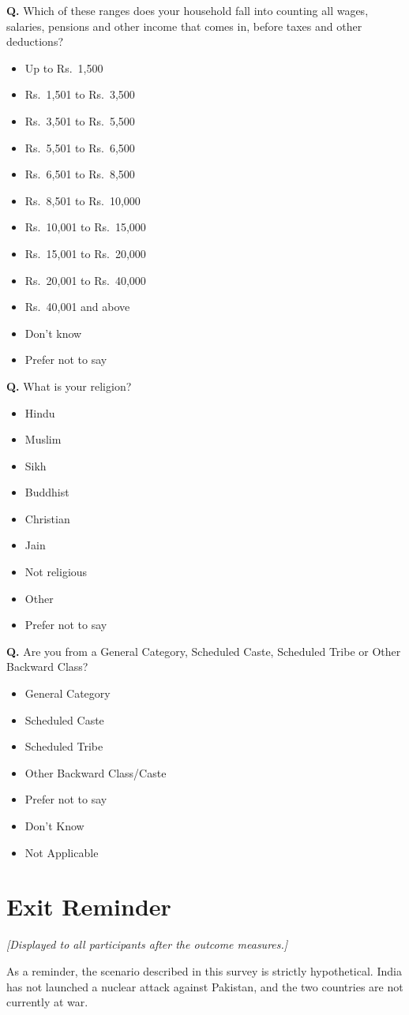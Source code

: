 \documentclass[12pt]{article}
\newcounter{qnum}
\newcommand{\question}[1]{%
  \stepcounter{qnum}%
  \noindent\textbf{Q\thequnum.} #1\par\medskip
}
\newcommand{\choices}[1]{%
  \begin{itemize}[leftmargin=2em, itemsep=2pt, topsep=2pt]
    #1
  \end{itemize}\medskip
}
\begin{document}
\question{Which of these ranges does your household fall into counting all wages, salaries, pensions and other income that comes in, before taxes and other deductions?}
\choices{
  \item Up to Rs.\ 1,500
  \item Rs.\ 1,501 to Rs.\ 3,500
  \item Rs.\ 3,501 to Rs.\ 5,500
  \item Rs.\ 5,501 to Rs.\ 6,500
  \item Rs.\ 6,501 to Rs.\ 8,500
  \item Rs.\ 8,501 to Rs.\ 10,000
  \item Rs.\ 10,001 to Rs.\ 15,000
  \item Rs.\ 15,001 to Rs.\ 20,000
  \item Rs.\ 20,001 to Rs.\ 40,000
  \item Rs.\ 40,001 and above
  \item Don't know
  \item Prefer not to say
}

\question{What is your religion?}
\choices{
  \item Hindu
  \item Muslim
  \item Sikh
  \item Buddhist
  \item Christian
  \item Jain
  \item Not religious
  \item Other
  \item Prefer not to say
}

\question{Are you from a General Category, Scheduled Caste, Scheduled Tribe or Other Backward Class?}
\choices{
  \item General Category
  \item Scheduled Caste
  \item Scheduled Tribe
  \item Other Backward Class/Caste
  \item Prefer not to say
  \item Don't Know
  \item Not Applicable
}

\section{Exit Reminder}

\noindent\textit{[Displayed to all participants after the outcome measures.]}

\bigskip

\noindent As a reminder, the scenario described in this survey is strictly hypothetical. India has not launched a nuclear attack against Pakistan, and the two countries are not currently at war.
\end{document}
